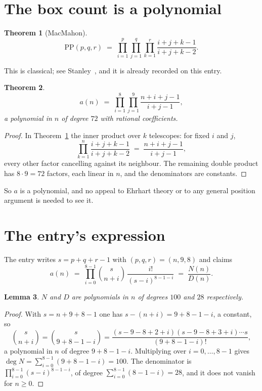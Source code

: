 \documentclass[11pt,a4paper]{article}
\theoremstyle{plain}
\newtheorem{theorem}{Theorem}
\newtheorem{lemma}[theorem]{Lemma}
\theoremstyle{definition}
\begin{document}
\section{The box count is a polynomial}

\begin{theorem}[MacMahon]\label{thm:mm}
\[
\mathrm{PP}(p,q,r)\;=\;\prod_{i=1}^{p}\prod_{j=1}^{q}\prod_{k=1}^{r}
\frac{i+j+k-1}{i+j+k-2} .
\]
\end{theorem}

This is classical; see Stanley~\cite{stanley}, and it is already recorded on this entry.

\begin{theorem}\label{thm:poly}
\[
a(n)\;=\;\prod_{i=1}^{8}\prod_{j=1}^{9}\frac{n+i+j-1}{i+j-1},
\]
a polynomial in $n$ of degree $72$ with rational coefficients.
\end{theorem}

\begin{proof}
In Theorem~\ref{thm:mm} the inner product over $k$ telescopes: for fixed $i$ and $j$,
\[
\prod_{k=1}^{n}\frac{i+j+k-1}{i+j+k-2}\;=\;\frac{n+i+j-1}{i+j-1} ,
\]
every other factor cancelling against its neighbour. The remaining double product has
$8\cdot9=72$ factors, each linear in $n$, and the denominators are constants.
\end{proof}

So $a$ is a polynomial, and no appeal to Ehrhart theory or to any general position argument is
needed to see it.

\section{The entry's expression}

The entry writes $s=p+q+r-1$ with $(p,q,r)=(n,9,8)$ and claims
\[
a(n)\;=\;\prod_{i=0}^{8-1}\binom{s}{n+i}\,\frac{i!}{(s-i)^{8-1-i}}\;=\;
\frac{N(n)}{D(n)} .
\]

\begin{lemma}\label{lem:deg}
$N$ and $D$ are polynomials in $n$ of degrees $100$ and $28$ respectively.
\end{lemma}

\begin{proof}
With $s=n+9+8-1$ one has $s-(n+i)=9+8-1-i$, a constant, so
\[
\binom{s}{n+i}=\binom{s}{9+8-1-i}
=\frac{(s-9-8+2+i)(s-9-8+3+i)\cdots s}{(9+8-1-i)!},
\]
a polynomial in $n$ of degree $9+8-1-i$. Multiplying over $i=0,\dots,8-1$ gives
$\deg N=\sum_{i=0}^{8-1}(9+8-1-i)=100$. The denominator is
$\prod_{i=0}^{8-1}(s-i)^{8-1-i}$, of degree
$\sum_{i=0}^{8-1}(8-1-i)=28$, and it does not vanish for $n\ge0$.
\end{proof}
\end{document}
